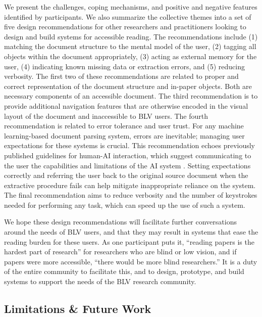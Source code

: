 We present the challenges, coping mechanisms, and positive and negative features identified by participants. We also summarize the collective themes into a set of five design recommendations for other researchers and practitioners looking to design and build systems for accessible reading. The recommendations include (1) matching the document structure to the mental model of the user, (2) tagging all objects within the document appropriately, (3) acting as external memory for the user, (4) indicating known missing data or extraction errors, and (5) reducing verbosity. The first two of these recommendations are related to proper and correct representation of the document structure and in-paper objects. Both are necessary components of an accessible document. The third recommendation is to provide additional navigation features that are otherwise encoded in the visual layout of the document and inaccessible to BLV users. The fourth recommendation is related to error tolerance and user trust. For any machine learning-based document parsing system, errors are inevitable; managing user expectations for these systems is crucial. This recommendation echoes previously published guidelines for human-AI interaction, which suggest communicating to the user the capabilities and limitations of the AI system \citep{Amershi2019GuidelinesFH}. Setting expectations correctly and referring the user back to the original source document when the extractive procedure fails can help mitigate inappropriate reliance on the system. The final recommendation aims to reduce verbosity and the number of keystrokes needed for performing any task, which can speed up the use of such a system.

We hope these design recommendations will facilitate further conversations around the needs of BLV users, and that they may result in systems that ease the reading burden for these users. As one participant puts it, ``reading papers is the hardest part of research'' for researchers who are blind or low vision, and if papers were more accessible, ``there would be more blind researchers.'' It is a duty of the entire community to facilitate this, and to design, prototype, and build systems to support the needs of the BLV research community.

\subsection{Limitations \& Future Work}
\label{sec:future_work}


